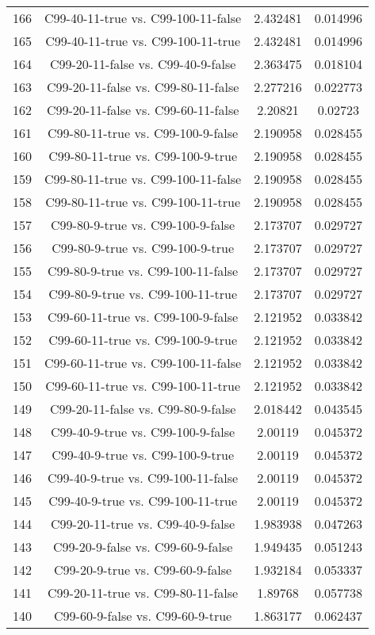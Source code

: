 \documentclass[a4paper,10pt]{article}
\begin{document}
\begin{landscape}
\begin{table}[!htp]
\begin{tabular}{cccc}
166&C99-40-11-true vs. C99-100-11-false&2.432481&0.014996\\
165&C99-40-11-true vs. C99-100-11-true&2.432481&0.014996\\
164&C99-20-11-false vs. C99-40-9-false&2.363475&0.018104\\
163&C99-20-11-false vs. C99-80-11-false&2.277216&0.022773\\
162&C99-20-11-false vs. C99-60-11-false&2.20821&0.02723\\
161&C99-80-11-true vs. C99-100-9-false&2.190958&0.028455\\
160&C99-80-11-true vs. C99-100-9-true&2.190958&0.028455\\
159&C99-80-11-true vs. C99-100-11-false&2.190958&0.028455\\
158&C99-80-11-true vs. C99-100-11-true&2.190958&0.028455\\
157&C99-80-9-true vs. C99-100-9-false&2.173707&0.029727\\
156&C99-80-9-true vs. C99-100-9-true&2.173707&0.029727\\
155&C99-80-9-true vs. C99-100-11-false&2.173707&0.029727\\
154&C99-80-9-true vs. C99-100-11-true&2.173707&0.029727\\
153&C99-60-11-true vs. C99-100-9-false&2.121952&0.033842\\
152&C99-60-11-true vs. C99-100-9-true&2.121952&0.033842\\
151&C99-60-11-true vs. C99-100-11-false&2.121952&0.033842\\
150&C99-60-11-true vs. C99-100-11-true&2.121952&0.033842\\
149&C99-20-11-false vs. C99-80-9-false&2.018442&0.043545\\
148&C99-40-9-true vs. C99-100-9-false&2.00119&0.045372\\
147&C99-40-9-true vs. C99-100-9-true&2.00119&0.045372\\
146&C99-40-9-true vs. C99-100-11-false&2.00119&0.045372\\
145&C99-40-9-true vs. C99-100-11-true&2.00119&0.045372\\
144&C99-20-11-true vs. C99-40-9-false&1.983938&0.047263\\
143&C99-20-9-false vs. C99-60-9-false&1.949435&0.051243\\
142&C99-20-9-true vs. C99-60-9-false&1.932184&0.053337\\
141&C99-20-11-true vs. C99-80-11-false&1.89768&0.057738\\
140&C99-60-9-false vs. C99-60-9-true&1.863177&0.062437\\

\end{tabular}
\end{table}
\end{landscape}
\end{document}
